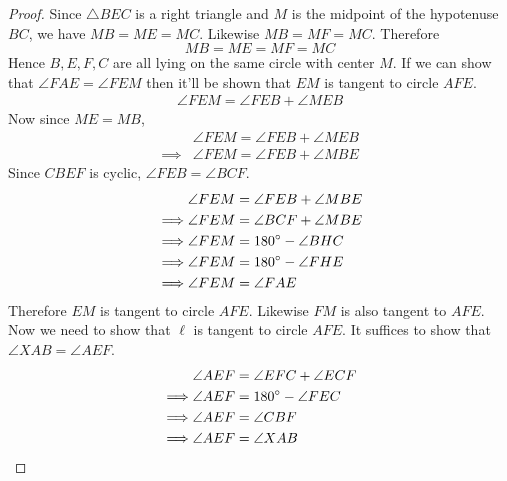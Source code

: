 \documentclass[11pt,numbers=noenddot,svgnames,dvipsnames]{scrartcl}
\begin{document}
\begin{proof}
    Since $\triangle BEC$ is a right triangle and $M$ is the midpoint of the hypotenuse $BC$, we have $MB = ME = MC$. 
    Likewise $MB = MF = MC$. Therefore 
    \[
        MB = ME = MF = MC
    \]
    Hence $B, E, F, C$ are all lying on the same circle with center $M$. If we can show that $\angle FAE = \angle FEM$ then 
    it'll be shown that $EM$ is tangent to circle $AFE$. 
    \begin{align*}
        \angle FEM = \angle FEB + \angle MEB 
    \end{align*}
    Now since $ME = MB$, 
    \begin{align*}
                 & \angle FEM = \angle FEB + \angle MEB \\
        \implies & \angle FEM = \angle FEB + \angle MBE 
    \end{align*}
    Since $CBEF$ is cyclic, $\angle FEB =  \angle BCF$.
    \begin{align*}
                 & \angle FEM = \angle FEB + \angle MBE \\
        \implies & \angle FEM = \angle BCF + \angle MBE \\
        \implies & \angle FEM = 180^\circ - \angle BHC \\
        \implies & \angle FEM = 180^\circ - \angle FHE \\ 
        \implies & \angle FEM = \angle FAE
    \end{align*}
    Therefore $EM$ is tangent to circle $AFE$. Likewise $FM$ is also tangent to $AFE$. Now we need to show 
    that $\ell$ is tangent to circle $AFE$. It suffices to show that $\angle XAB = \angle AEF$. \\
    \begin{align*}
                 & \angle AEF = \angle EFC + \angle ECF \\
        \implies & \angle AEF = 180^\circ - \angle FEC \\
        \implies & \angle AEF = \angle CBF \\
        \implies & \angle AEF = \angle XAB
    \end{align*}
\end{proof}
\end{document}
